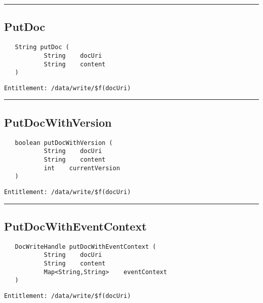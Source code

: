 \rule{12cm}{2pt}
\subsection{PutDoc}
\label{Api:PutDoc}
\begin{verbatim}
   String putDoc (
           String    docUri
           String    content
   )
\end{verbatim}
\begin{Verbatim}[fontsize=\small, formatcom=\color{Maroon}]
  Entitlement: /data/write/$f(docUri)
\end{Verbatim}



\rule{12cm}{2pt}
\subsection{PutDocWithVersion}
\label{Api:PutDocWithVersion}
\begin{verbatim}
   boolean putDocWithVersion (
           String    docUri
           String    content
           int    currentVersion
   )
\end{verbatim}
\begin{Verbatim}[fontsize=\small, formatcom=\color{Maroon}]
  Entitlement: /data/write/$f(docUri)
\end{Verbatim}



\rule{12cm}{2pt}
\subsection{PutDocWithEventContext}
\label{Api:PutDocWithEventContext}
\begin{verbatim}
   DocWriteHandle putDocWithEventContext (
           String    docUri
           String    content
           Map<String,String>    eventContext
   )
\end{verbatim}
\begin{Verbatim}[fontsize=\small, formatcom=\color{Maroon}]
  Entitlement: /data/write/$f(docUri)
\end{Verbatim}



